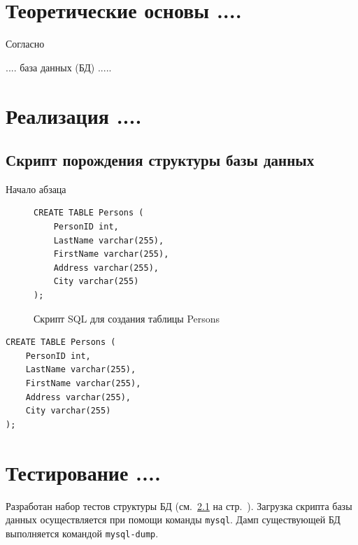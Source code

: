 \documentclass[12pt,final]{report}
\begin{document}
\chapter{Теоретические основы ....}

Согласно \cite{bratko90}

.... база данных (БД) .....

\chapter{Реализация ....}

\section{Скрипт порождения структуры базы данных}
\label{sec:struct-bd}

Начало абзаца


\begin{figure}[htbp]
\begin{center}
\begin{verbatim}
CREATE TABLE Persons (
    PersonID int,
    LastName varchar(255),
    FirstName varchar(255),
    Address varchar(255),
    City varchar(255)
);
\end{verbatim}
\end{center}
\caption{Скрипт SQL для создания таблицы Persons}\label{fig:crate-table}
\end{figure}


\begin{listing}[htbp]
\begin{center}

{\footnotesize
\begin{verbatim}
CREATE TABLE Persons (
    PersonID int,
    LastName varchar(255),
    FirstName varchar(255),
    Address varchar(255),
    City varchar(255)
);
\end{verbatim}}

\end{center}
\caption{Скрипт SQL для создания таблицы Persons}\label{fig:crate-table}
\end{listing}

\chapter{Тестирование ....}

Разработан набор тестов структуры БД (см.~\ref{sec:struct-bd} на стр.~\pageref{sec:struct-bd}).   Загрузка скрипта базы данных осуществляется при помощи команды \texttt{mysql}.  Дамп существующей БД выполняется командой \verb|mysql-dump|.
\end{document}
